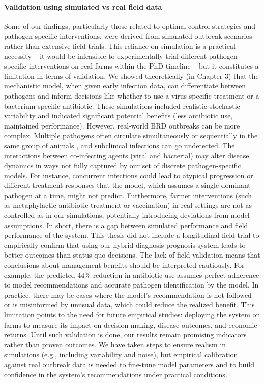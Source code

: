\paragraph{Validation using simulated vs real field data} Some of our findings, particularly those related to optimal control strategies and pathogen-specific interventions, were derived from simulated outbreak scenarios rather than extensive field trials. This reliance on simulation is a practical necessity – it would be infeasible to experimentally trial different pathogen-specific interventions on real farms within the PhD timeline – but it constitutes a limitation in terms of validation. We showed theoretically (in Chapter 3) that the mechanistic model, when given early infection data, can differentiate between pathogens and inform decisions like whether to use a virus-specific treatment or a bacterium-specific antibiotic. These simulations included realistic stochastic variability and indicated significant potential benefits (less antibiotic use, maintained performance). However, real-world BRD outbreaks can be more complex. Multiple pathogens often circulate simultaneously or sequentially in the same group of animals \cite{Gaudino2022}, and subclinical infections can go undetected. The interactions between co-infecting agents (viral and bacterial) may alter disease dynamics in ways not fully captured by our set of discrete pathogen-specific models. For instance, concurrent infections could lead to atypical progression or different treatment responses that the model, which assumes a single dominant pathogen at a time, might not predict. Furthermore, farmer interventions (such as metaphylactic antibiotic treatment or vaccination) in real settings are not as controlled as in our simulations, potentially introducing deviations from model assumptions. In short, there is a gap between simulated performance and field performance of the system. This thesis did not include a longitudinal field trial to empirically confirm that using our hybrid diagnosis-prognosis system leads to better outcomes than status quo decisions. The lack of field validation means that conclusions about management benefits should be interpreted cautiously. For example, the predicted 44\% reduction in antibiotic use assumes perfect adherence to model recommendations and accurate pathogen identification by the model. In practice, there may be cases where the model’s recommendation is not followed or is misinformed by unusual data, which could reduce the realized benefit. This limitation points to the need for future empirical studies: deploying the system on farms to measure its impact on decision-making, disease outcomes, and economic returns. Until such validation is done, our results remain promising indicators rather than proven outcomes. We have taken steps to ensure realism in simulations (e.g., including variability and noise), but empirical calibration against real outbreak data is needed to fine-tune model parameters and to build confidence in the system’s recommendations under practical conditions.

